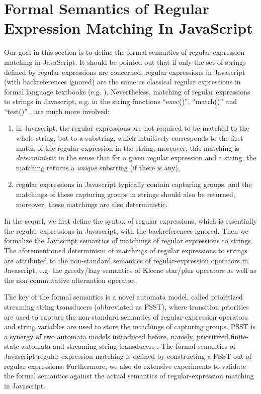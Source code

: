 
\section{Formal Semantics of Regular Expression Matching In JavaScript}\label{sec-rwre}
Our goal in this section is to define the formal semantics of regular expression matching in JavaScript. 
%
It should be pointed out that if only the set of strings defined by regular expressions are concerned, regular expressions in Javascript (with backreferences ignored) are the same as classical regular expressions in formal language textbooks (e.g. \cite{HU79}). Nevertheless, matching of regular expressions to strings in Javascript, e.g. in the string functions ``exec()'', ``match()'' and ``test()'' , are much more involved: 
\begin{enumerate}
\item in Javascript, the regular expressions are not required to be matched to the whole string, but to a substring, which intuitively corresponds to the first match of the regular expression in the string, moreover, this matching is \emph{deterministic} in the sense that for a given regular expression and a string, the matching returns a \emph{unique} substring (if there is any), 
%
\item regular expressions in Javascript typically contain capturing groups, and the matchings of these capturing groups in strings should also be returned, moreover, these matchings are also deterministic.
\end{enumerate}

In the sequel, we first define the syntax of regular expressions, which is essentially the regular expressions in Javascript, with the backreferences ignored. 
%
Then we formalize the Javascript semantics of matchings of regular expressions to strings. The aforementioned determinism of matchings of regular expressions to strings are attributed to the non-standard semantics of regular-expression operators in Javascript, e.g. the greedy/lazy semantics of Kleene star/plus operators as well as the non-commutative alternation operator.  

The key of the formal semantics is a novel automata model, called prioritized streaming string transducers (abbreviated as PSST), where transition priorities are used to capture the non-standard semantics of regular-expression operators and string variables are used to store the matchings of capturing groups. PSST is a synergy of two automata models introduced before, namely, prioritized finite-state automata \cite{BM17} and streaming string transducers \cite{AC10,AD11}. The formal semantics of Javascript regular-expression matching is defined by constructing a PSST out of regular expressions. 
%
Furthermore, we also do extensive experiments to validate the formal semantics against the actual semantics of regular-expression matching in Javascript.

